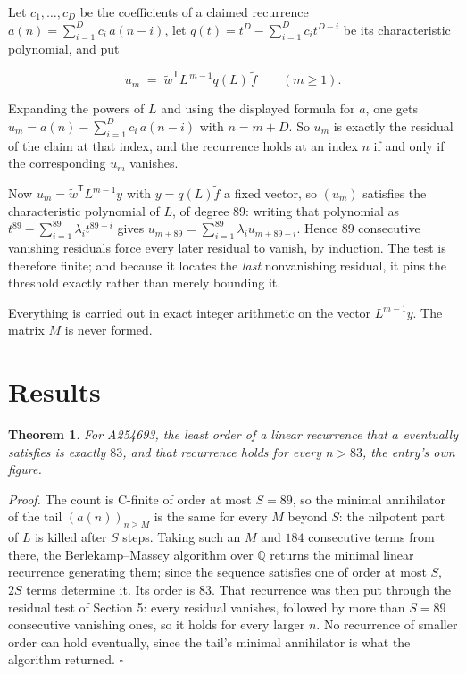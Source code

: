 \documentclass[11pt]{article}
\newtheorem{theorem}{Theorem}
\theoremstyle{definition}
\begin{document}
Let $c_1,\dots,c_D$ be the coefficients of a claimed recurrence $a(n) = \sum_{i=1}^{D} c_i\,a(n-i)$, let $q(t) = t^{D} - \sum_{i=1}^{D} c_i t^{D-i}$ be its characteristic polynomial, and put

\[u_m \;=\; \tilde w^{\mathsf T} L^{\,m-1} q(L)\,\tilde f \qquad (m \ge 1).\]

Expanding the powers of $L$ and using the displayed formula for $a$, one gets $u_m = a(n) - \sum_{i=1}^{D} c_i\,a(n-i)$ with $n = m + D$. So $u_m$ is exactly the residual of the claim at that index, and the recurrence holds at an index $n$ if and only if the corresponding $u_m$ vanishes.

Now $u_m = \tilde w^{\mathsf T} L^{m-1} y$ with $y = q(L)\tilde f$ a fixed vector, so $(u_m)$ satisfies the characteristic polynomial of $L$, of degree $89$: writing that polynomial as $t^{89} - \sum_{i=1}^{89} \lambda_i t^{89-i}$ gives $u_{m+89} = \sum_{i=1}^{89} \lambda_i u_{m+89-i}$. Hence $89$ consecutive vanishing residuals force every later residual to vanish, by induction. The test is therefore finite; and because it locates the {\itshape last} nonvanishing residual, it pins the threshold exactly rather than merely bounding it.

Everything is carried out in exact integer arithmetic on the vector $L^{m-1}y$. The matrix $M$ is never formed.

\section{Results}

\begin{theorem} For A254693, the least order of a linear recurrence that $a$ eventually satisfies is exactly $83$, and that recurrence holds for every $n > 83$, the entry's own figure.\end{theorem}

{\itshape Proof.} The count is C-finite of order at most $S = 89$, so the minimal annihilator of the tail $(a(n))_{n \ge M}$ is the same for every $M$ beyond $S$: the nilpotent part of $L$ is killed after $S$ steps. Taking such an $M$ and $184$ consecutive terms from there, the Berlekamp--Massey algorithm over $\mathbb{Q}$ returns the minimal linear recurrence generating them; since the sequence satisfies one of order at most $S$, $2S$ terms determine it. Its order is $83$. That recurrence was then put through the residual test of Section 5: every residual vanishes, followed by more than $S = 89$ consecutive vanishing ones, so it holds for every larger $n$. No recurrence of smaller order can hold eventually, since the tail's minimal annihilator is what the algorithm returned. $\square$
\end{document}
